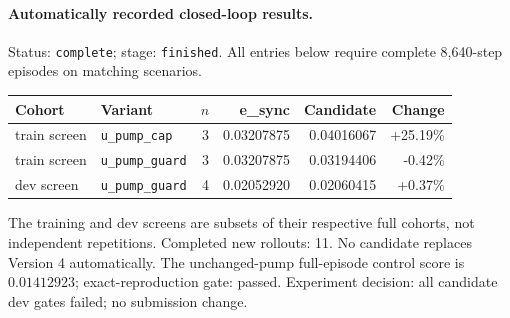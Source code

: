 \paragraph{Automatically recorded closed-loop results.}
Status: \texttt{complete}; stage: \texttt{finished}.
All entries below require complete 8,640-step episodes on matching scenarios.
\begin{center}\small
\begin{tabular}{llrrrr}\toprule
Cohort & Variant & $n$ & e\_sync & Candidate & Change \\\midrule
train screen & \texttt{u\_pump\_cap} & 3 & 0.03207875 & 0.04016067 & +25.19\% \\
train screen & \texttt{u\_pump\_guard} & 3 & 0.03207875 & 0.03194406 & -0.42\% \\
dev screen & \texttt{u\_pump\_guard} & 4 & 0.02052920 & 0.02060415 & +0.37\% \\
\bottomrule\end{tabular}\end{center}
The training and dev screens are subsets of their respective full cohorts, not independent repetitions.
Completed new rollouts: 11. No candidate replaces Version 4 automatically.
The unchanged-pump full-episode control score is $0.01412923$; exact-reproduction gate: passed.
Experiment decision: all candidate dev gates failed; no submission change.
